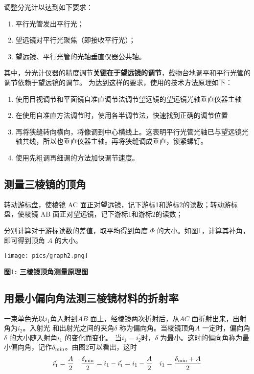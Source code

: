 \documentclass[10pt,a4paper]{article}	%
\makeatletter
\newenvironment{figurehere}
{\def\@captype{figure}}
{}
\makeatother
\begin{document}
	调整分光计以达到如下要求：

	\begin{enumerate}
		\item 平行光管发出平行光；
		\item 望远镜对平行光聚焦（即接收平行光）；
		\item 望远镜、平行光管的光轴垂直仪器公共轴。
	\end{enumerate}

	其中，分光计仪器的精度调节\textbf{关键在于望远镜的调节}，载物台地调平和平行光管的调节依赖于望远镜的调节。
	为达到这样的要求，使用的技术方法原理如下：
	\begin{enumerate}
		\item 使用目视调节和平面镜自准直调节法调节望远镜的望远镜光轴垂直仪器主轴
		\item 在使用自准直方法调节时，使用各半调节法，快速找到正确的调节位置
		\item 再将狭缝转向横向，将像调到中心横线上。这表明平行光管光轴已与望远镜光轴共线，所以也垂直仪器主轴。再将狭缝调成垂直，锁紧螺钉。
		\item 使用先粗调再细调的方法加快调节速度。
	\end{enumerate}

	\subsection{测量三棱镜的顶角}
	转动游标盘，使棱镜 AC 面正对望远镜，记下游标1和游标2的读数；转动游标盘，使棱镜 AB 面正对望远镜，记下游标1和游标2的读数；

	分别计算对于游标读数的差值，取平均得到角度 $\Phi$ 的大小。如图1，计算其补角，即可得到顶角 $A$ 的大小。

	\begin{figurehere}
		\centering
		\texttt{[image: pics/graph2.png]}
		\caption*{\bf 图1: 三棱镜顶角测量原理图}
	\end{figurehere}

	\subsection{用最小偏向角法测三棱镜材料的折射率}

	
	一束单色光以$i_1$角入射到$AB$ 面上，经棱镜两次折射后，从$AC$ 面折射出来，出射角为$i_2$。入射光
	和出射光之间的夹角$\delta$ 称为偏向角。当棱镜顶角$A$ 一定时，偏向角$\delta$ 的大小随入射角$i_1$ 的变化而变化。
	当$i_1 = i_2^{\prime} $时，$\delta$ 为最小。这时的偏向角称为最小偏向角，记作$\delta_{\rm min}$。由图2可以看出，这时
	\[
		i_1^{\prime}=\frac{A}{2} \quad \frac{\delta_{\rm min}}{2}=i_1-i_1^{\prime}=i_1-\frac{A}{2} \quad i_1=\frac{\delta_{\rm min}+A}{2}
	\]
\end{document}
